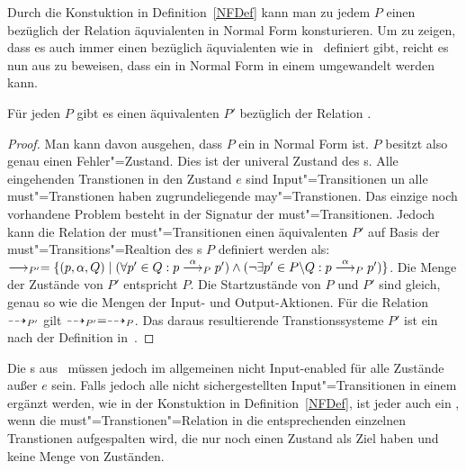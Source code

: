 Durch die Konstuktion in Definition~\ref{NFDef} kann man zu jedem \MEIO{} $P$
einen bezüglich der Relation \ERel{} äquvialenten \MEIO{} in Normal Form
konsturieren. Um zu zeigen, dass es auch immer einen bezüglich \ERel{}
äquvialenten \MIA{} wie in~\cite{Vogler2016MIA3} definiert gibt, reicht es nun
aus zu beweisen, dass ein \MEIO{} in Normal Form in einem \MIA{} umgewandelt
werden kann.

\begin{Satz}
  Für jeden \MEIO{} $P$ gibt es einen äquivalenten \MIA{} $P'$ bezüglich der
  Relation \ERel{}.
\end{Satz}
\begin{proof}
  Man kann \oBdA{} davon ausgehen, dass $P$ ein \MEIO{} in Normal Form ist. $P$
  besitzt also genau einen Fehler"=Zustand. Dies ist der univeral Zustand des
  \MIA{}s. Alle eingehenden Transtionen in den Zustand $e$ sind
  Input"=Transitionen un alle must"=Transtionen haben zugrundeliegende
  may"=Transtionen. Das einzige noch vorhandene Problem besteht in der Signatur
  der must"=Transitionen. Jedoch kann die Relation der must"=Transitionen einen
  äquivalenten \MIA{} $P'$ auf Basis der must"=Transitions"=Realtion des
  \MEIO{}s $P$ definiert werden als: $\must _{P'} = \{(p, \alpha , Q) \mid
  (\forall p' \in Q: p \must[\alpha]_P p') \land (\neg \exists p' \in P
  \backslash Q: p \must[\alpha]_P p')\}$. Die Menge der Zustände von $P'$
  entspricht $P$. Die Startzustände von $P$ und $P'$ sind gleich, genau so wie
  die Mengen der Input- und Output-Aktionen. Für die Relation $\may _{P'}$ gilt
  $\may _{P'} = \may _{P}$. Das daraus resultierende Transtionssysteme $P'$ ist
  ein \MIA{} nach der Definition in~\cite{Vogler2016MIA3}.
\end{proof}

Die \MIA{}s aus~\cite{Vogler2016MIA3} müssen jedoch im allgemeinen nicht
Input-enabled für alle Zustände außer $e$ sein. Falls jedoch alle nicht
sichergestellten Input"=Transitionen in einem \MIA{} ergänzt werden, wie in der
Konstuktion in Definition~\ref{NFDef}, ist jeder \MIA{} auch ein \MEIO{}, wenn
die must"=Transtionen"=Relation in die entsprechenden einzelnen Transtionen
aufgespalten wird, die nur noch einen Zustand als Ziel haben und keine Menge
von Zuständen.
